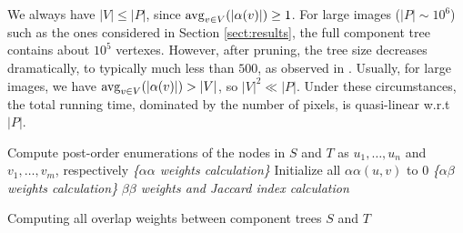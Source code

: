 We always have $|V|\le|P|$, since $\mathrm{avg}_{v\in V}(|\alpha(v)|) \ge 1$.
For large images ($|P| \sim 10^6$) such as the ones considered in Section
\ref{sect:results}, the full component tree contains about $10^5$ vertexes.  
However, after pruning, the tree size decreases dramatically, to typically much
less than $500$, as observed in \cite{Xiao:2011}.  
Usually, for large images, we have $\mathrm{avg}_{v\in V}(|\alpha(v)|) > |V|$, so $|V|^2
\ll |P|$. Under these circumstances, the total running time, dominated by the
number of pixels, is quasi-linear w.r.t $|P|$.

\begin{algorithm}[H]
\SetAlgoLined
{}
Compute post-order enumerations of the nodes in $S$ and $T$ as $u_1,\ldots,u_n$ and $v_1, \ldots, v_m$, respectively\;
\emph{\{$\alpha\alpha$ weights calculation\}}\;
Initialize all $\alpha\alpha(u,v)$ to 0\;
\emph{\{$\alpha\beta$ weights calculation\}}\;
\emph{$\beta\beta$ weights and Jaccard index calculation}\;
\caption{Computing all overlap weights between component trees $S$ and $T$}
\label{alg:cptree-weights}
\end{algorithm}
